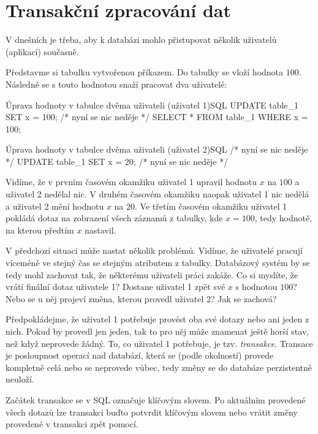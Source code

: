 \section{Transakční zpracování dat}
V dnešních  je třeba, aby k databázi mohlo přistupovat několik uživatelů (aplikací) současně.
\begin{upexample}
Představme si tabulku vytvořenou příkazem. Do tabulky se vloží hodnota $100$. Následně se s touto hodnotou snaží pracovat dva uživatelé:
\begin{upcode}{Úprava hodnoty v tabulce dvěma uživateli (uživatel 1)}{}{SQL}
UPDATE table_1 SET x = 100;
/* nyní se nic neděje */
SELECT * FROM table_1 WHERE x = 100;
\end{upcode}
\begin{upcode}{Úprava hodnoty v tabulce dvěma uživateli (uživatel 2)}{}{SQL}
/* nyní se nic neděje */
UPDATE table_1 SET x = 20;
/* nyní se nic neděje */
\end{upcode}
Vidíme, že v prvním časovém okamžiku uživatel 1 upravil hodnotu $x$ na $100$ a uživatel 2 nedělal nic. V druhém časovém okamžiku naopak uživatel 1 nic nedělá a uživatel 2 mění hodnotu $x$ na $20$. Ve třetím časovém okamžiku uživatel 1 pokládá dotaz na zobrazení všech záznamů z tabulky, kde $x = 100$, tedy hodnotě, na kterou předtím $x$ nastavil.

V předchozí situaci může nastat několik problémů. Vidíme, že uživatelé pracují víceméně ve stejný čas se stejným atributem z tabulky. Databázový systém by se tedy mohl zachovat tak, že některému uživateli práci zakáže. Co si myslíte, že vrátí finální dotaz uživatele 1? Dostane uživatel 1 zpět své $x$ s hodnotou $100$? Nebo se u něj projeví změna, kterou provedl uživatel 2? Jak se  zachová?

Předpokládejme, že uživatel 1 potřebuje provést oba své dotazy nebo ani jeden z nich. Pokud by provedl jen jeden, tak to pro něj může znamenat ještě horší stav, než když neprovede žádný. To, co uživatel 1 potřebuje, je tzv. \textit{transakce}. Transace je posloupnost operací nad databází, která se (podle okolností) provede kompletně celá nebo se neprovede vůbec, tedy změny se do databáze perzistentně neuloží.

Začátek transakce se v SQL označuje klíčovým slovem. Po aktuálním provedené všech dotazů lze transakci buďto potvrdit klíčovým slovem nebo vrátit změny provedené v transakci zpět pomocí.
\end{upexample}

